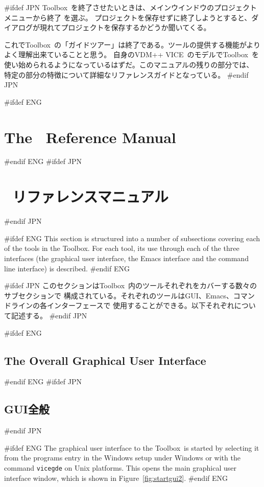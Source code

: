 \documentclass[\pformat,12pt]{article}
\newcommand{\vdmslpp}{VDM-SL}
\newcommand{\Toolbox}{Toolbox}
\newcommand{\vdmgde}{vdmgde}
\newcommand{\vdmslpp}{VDM++}
\newcommand{\Toolbox}{Toolbox}
\newcommand{\vdmgde}{vppgde}
\renewcommand{\vdmslpp}{VDM++ VICE}
\renewcommand{\vdmgde}{vicegde}
\newcommand{\guicmd}[1]{{\sf #1}}
\newcommand{\guicmd}[1]{{\gt #1}}
\begin{document}
#ifdef JPN
\Toolbox\ を終了させたいときは、メインウインドウの\guicmd{プロジェクト} メニューから\guicmd{終了} を選ぶ。
プロジェクトを保存せずに終了しようとすると、ダイアログが現れてプロジェクトを保存するかどうか聞いてくる。

これで\Toolbox\ の「ガイドツアー」は終了である。ツールの提供する機能がよりよく理解出来ていることと思う。
自身の\vdmslpp\ のモデルで\Toolbox\ を使い始められるようになっているはずだ。このマニュアルの残りの部分では、
特定の部分の特徴について詳細なリファレンスガイドとなっている。
#endif JPN

\newpage
#ifdef ENG
\section{The \protect\VDMTools\ Reference Manual}\label{sec:ref}
#endif ENG
#ifdef JPN
\section{\protect\VDMTools\ リファレンスマニュアル}\label{sec:ref}
#endif JPN

#ifdef ENG
This section is structured into a number of subsections covering each
of the tools in the \Toolbox. For each tool, its use through each of
the three interfaces (the graphical user interface, the Emacs
interface and the command line interface) is described.
#endif ENG

#ifdef JPN
このセクションは\Toolbox\ 内のツールそれぞれをカバーする数々のサブセクションで
構成されている。それぞれのツールはGUI、Emacs、コマンドラインの各インターフェースで
使用することができる。以下それぞれについて記述する。
#endif JPN

#ifdef ENG
\subsection{The Overall Graphical User Interface}\label{sec:GUI}
#endif ENG
#ifdef JPN
\subsection{GUI全般}\label{sec:GUI}
#endif JPN

#ifdef ENG
The graphical user interface to the \Toolbox\ is started by selecting
it from the programs entry in the Windows setup under Windows or with
the command {\tt \vdmgde} on Unix platforms.
This opens the main graphical user interface window, which is shown in 
Figure~\ref{fig:startgui2}. 
#endif ENG
\end{document}
